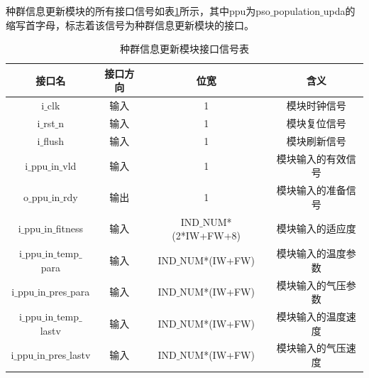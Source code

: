 种群信息更新模块的所有接口信号如表\ref{tab:种群信息更新模块接口信号表}所示，其中ppu为pso$\_$population$\_$upda的缩写首字母，标志着该信号为种群信息更新模块的接口。
\begin{table}[H]
    \centering
    \caption{种群信息更新模块接口信号表}
    \label{tab:种群信息更新模块接口信号表}
    \begin{tabular}{c|c|c|c}
        \hline
        接口名                               & 接口方向  & 位宽               &含义                        \\ \hline
        i$\_$clk                                       & 输入      & 1                     & 模块时钟信号             \\ \hline
        i$\_$rst$\_$n                                  & 输入      & 1                     & 模块复位信号             \\ \hline
        i$\_$flush                                     & 输入      & 1                     & 模块刷新信号             \\ \hline
        i$\_$ppu$\_$in$\_$vld                          & 输入      & 1                     & 模块输入的有效信号        \\ \hline
        o$\_$ppu$\_$in$\_$rdy                          & 输出      & 1                     & 模块输入的准备信号        \\ \hline
        i$\_$ppu$\_$in$\_$fitness                      & 输入      & IND$\_$NUM*(2*IW+FW+8) & 模块输入的适应度          \\ \hline
        i$\_$ppu$\_$in$\_$temp$\_$para                 & 输入      & IND$\_$NUM*(IW+FW)    & 模块输入的温度参数        \\ \hline
        i$\_$ppu$\_$in$\_$pres$\_$para                 & 输入      & IND$\_$NUM*(IW+FW)    & 模块输入的气压参数        \\ \hline
        i$\_$ppu$\_$in$\_$temp$\_$lastv                & 输入      & IND$\_$NUM*(IW+FW)    & 模块输入的温度速度        \\ \hline
        i$\_$ppu$\_$in$\_$pres$\_$lastv                & 输入      & IND$\_$NUM*(IW+FW)    & 模块输入的气压速度       \\ \hline


\end{tabular}
\end{table}
